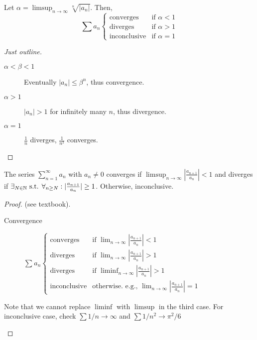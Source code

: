 \begin{thm}
	Let $\alpha=\limsup_{n\to \infty}{\sqrt[n]{|a_n|}}$. Then,
	\[
		\sum{a_{n}}
		\begin{cases}
			\text{converges}    & \text{if } \alpha<1 \\
			\text{diverges}     & \text{if } \alpha>1 \\
			\text{inconclusive} & \text{if } \alpha=1
		\end{cases}
	\]

	\begin{proof}[Just outline]
		\begin{description}
			\item[$\alpha< \beta < 1$]
			      Eventually $|a_n|\le \beta^{n}$, thus convergence.
			\item[$\alpha > 1$]
			      $|a_{n}|>1$ for infinitely many $n$, thus divergence.
			\item[$\alpha=1$]
			      $\frac{1}{n}$ diverges, $\frac{1}{n^2}$ converges.
		\end{description}
	\end{proof}
\end{thm}
\begin{thm}
	The series $\sum_{n=1}^{\infty}{a_{n}}$ with $a_{n}\neq 0$ converges if $\limsup_{n\to \infty}{|\frac{a_{n+1}}{a_{n}}|}<1$ and diverges if $\exists_{N \in \mathbb{N}} \text{ s.t. } \forall_{n \ge  N}:  |\frac{a_{n+1}}{a_{n}}|\ge 1 $. Otherwise, inconclusive.
	\begin{proof}
		(see textbook).\\
		\begin{description}
			\item[Convergence]
			      $\sum_{}{a_{n}}
				      \begin{cases}
					      \text{converges}    & \text{if } \lim_{n\to \infty}{|\frac{a_{n+1}}{a_{n}}|}<1               \\
					      \text{diverges}     & \text{if } \lim_{n\to \infty}{|\frac{a_{n+1}}{a_{n}}|}>1               \\
					      \text{diverges}     & \text{if } \liminf_{n\to \infty}{|\frac{a_{n+1}}{a_{n}}|}>1            \\
					      \text{inconclusive} & \text{otherwise. e.g., } \lim_{n\to \infty}{|\frac{a_{n+1}}{a_{n}}|}=1
				      \end{cases}
			      $
		\end{description}
		\begin{note}
			Note that we cannot replace $\liminf$ with $\limsup$ in the third case.
			For inconclusive case, check $\sum{1/n}\to \infty$ and $\sum{1/n^2}\to \pi ^2 /6$
		\end{note}
	\end{proof}
\end{thm}



